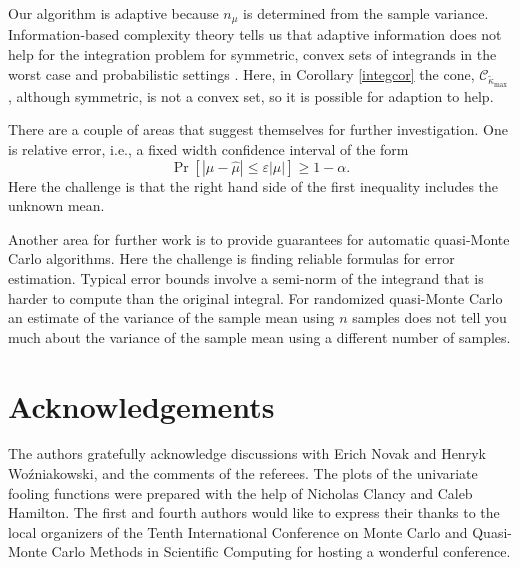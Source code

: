 \documentclass[graybox]{svmult}
\newcommand{\abs}[1]{\left|#1\right|}
\newcommand{\hmu}{\hat{\mu}}
\newcommand{\tkappa}{\tilde{\kappa}}
\newcommand{\cc}{\mathcal{C}}
\def\abs#1{\ensuremath{\left \lvert #1 \right \rvert}}
\begin{document}
Our algorithm is adaptive because $n_\mu$ is determined from the sample variance.  Information-based complexity theory tells us that adaptive information does not help for the integration problem for symmetric, convex sets of integrands in the worst case and %
probabilistic settings \citep[Chapter 4, Theorem 5.2.1; Chapter 8, Corollary 5.3.1]{TraWasWoz88}.  Here, in Corollary \ref{integcor} the cone, $\cc_{\tkappa_{\max}}$, although symmetric, is not a convex set, so it is possible for adaption to help.

There are a couple of areas that suggest themselves for further investigation.  One is relative error, i.e., a fixed width confidence interval of the form 
\[
\Pr[\abs{\mu-\hmu} \le \varepsilon \abs{\mu}] \ge 1-\alpha.
\]
Here the challenge is that the right hand side of the first inequality includes the unknown mean.

Another area for further work is to provide guarantees for automatic quasi-Monte Carlo algorithms. Here the challenge is finding reliable formulas for error estimation.  Typical error bounds involve a semi-norm of the integrand that is harder to compute than the original integral.  For randomized quasi-Monte Carlo an estimate of the variance of the sample mean using $n$ samples does not tell you much about the variance of the sample mean using a different number of samples.


\section*{Acknowledgements} The authors gratefully acknowledge discussions with Erich Novak and Henryk Wo\'zniakowski, and the comments of the referees.  
The plots of the univariate fooling functions were prepared with the help of Nicholas Clancy and Caleb Hamilton.  The first and fourth authors would like to express their thanks to the local organizers of the Tenth International Conference on Monte Carlo and Quasi-Monte Carlo Methods in Scientific Computing for hosting a wonderful conference.



\end{document}
